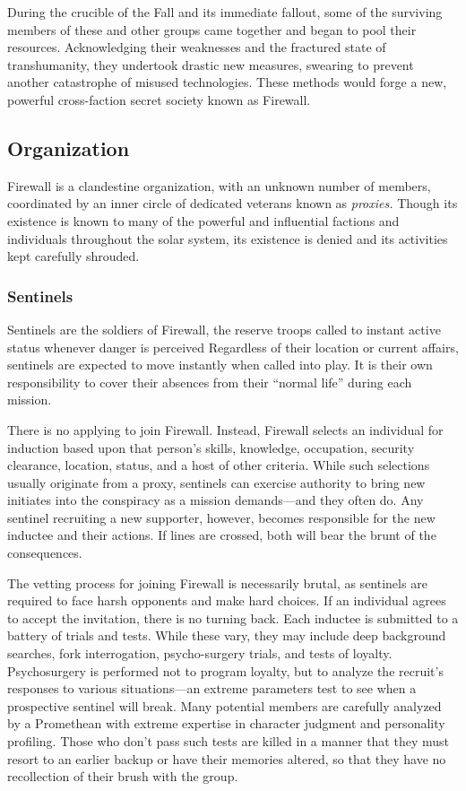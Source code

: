 During the crucible of the Fall and its immediate 
fallout, some of the surviving members of these and 
other groups came together and began to pool their 
resources. Acknowledging their weaknesses and the 
fractured state of transhumanity, they undertook 
drastic new measures, swearing to prevent another 
catastrophe of misused technologies. These methods 
would forge a new, powerful cross-faction secret society
known as Firewall.

\subsection{Organization }

Firewall is a clandestine organization, with an unknown
number of members, coordinated by an inner
circle of dedicated veterans known as \textit{proxies.} Though 
its existence is known to many of the powerful and 
influential factions and individuals throughout the 
solar system, its existence is denied and its activities 
kept carefully shrouded. 

\subsubsection{Sentinels}

Sentinels are the soldiers of Firewall, the reserve troops 
called to instant active status whenever danger is perceived
Regardless of their location or current affairs,
sentinels are expected to move instantly when called 
into play. It is their own responsibility to cover their 
absences from their ``normal life'' during each mission. 

There is no applying to join Firewall. Instead, Firewall
selects an individual for induction based upon
that person's skills, knowledge, occupation, security 
clearance, location, status, and a host of other criteria. 
While such selections usually originate from a proxy, 
sentinels can exercise authority to bring new initiates 
into the conspiracy as a mission demands—and they 
often do. Any sentinel recruiting a new supporter, 
however, becomes responsible for the new inductee 
and their actions. If lines are crossed, both will bear 
the brunt of the consequences. 

The vetting process for joining Firewall is necessarily
brutal, as sentinels are required to face harsh
opponents and make hard choices. If an individual 
agrees to accept the invitation, there is no turning 
back. Each inductee is submitted to a battery of trials 
and tests. While these vary, they may include deep 
background searches, fork interrogation, psycho-surgery
trials, and tests of loyalty. Psychosurgery is
performed not to program loyalty, but to analyze the 
recruit's responses to various situations—an extreme 
parameters test to see when a prospective sentinel 
will break. Many potential members are carefully 
analyzed by a Promethean with extreme expertise in 
character judgment and personality profiling. Those 
who don't pass such tests are killed in a manner that 
they must resort to an earlier backup or have their 
memories altered, so that they have no recollection of 
their brush with the group.

